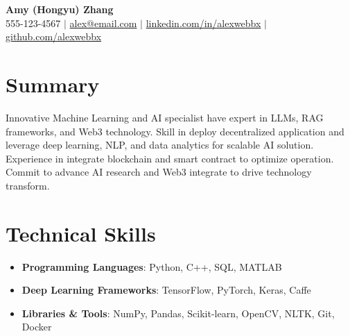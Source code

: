 \documentclass[letterpaper,10pt]{article}
\newcommand{\resumeItem}[1]{\item\small{#1}}
\newcommand{\resumeSubHeadingList}{\begin{itemize}[leftmargin=0.15in, label={}]}
\newcommand{\resumeSubHeadingListEnd}{\end{itemize}}
\begin{document}
\begin{center}
  \textbf{\Huge Amy (Hongyu) Zhang} \\
  \small 555-123-4567 $|$ \href{mailto:alex@email.com}{alex@email.com} $|$ 
  \href{https://linkedin.com/in/burhan-webb}{linkedin.com/in/alexwebbx} $|$
  \href{https://github.com/zwayth}{github.com/alexwebbx}
\end{center}

\section*{Summary}
Innovative Machine Learning and AI specialist have expert in LLMs, RAG frameworks, and Web3 technology. Skill in deploy decentralized application and leverage deep learning, NLP, and data analytics for scalable AI solution. Experience in integrate blockchain and smart contract to optimize operation. Commit to advance AI research and Web3 integrate to drive technology transform.

\section{Technical Skills}
\resumeSubHeadingList
  \resumeItem{\textbf{Programming Languages}: Python, C++, SQL, MATLAB}
  \resumeItem{\textbf{Deep Learning Frameworks}: TensorFlow, PyTorch, Keras, Caffe}
  \resumeItem{\textbf{Libraries \& Tools}: NumPy, Pandas, Scikit-learn, OpenCV, NLTK, Git, Docker}
\resumeSubHeadingListEnd
\end{document}
